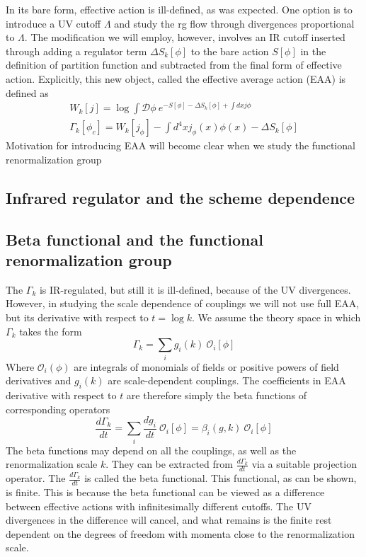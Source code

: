 \documentclass[11pt, a4paper]{article}
\begin{document}
In its bare form, effective action is ill-defined, as was expected. One option is to introduce a UV cutoff $\Lambda$
and study the rg flow through divergences proportional to $\Lambda$. The modification we will employ, however, involves
an IR cutoff inserted through adding a regulator term $\Delta S_k[\phi]$ to the bare action $S[\phi]$ in the definition of partition function
and subtracted from the final form of effective action. Explicitly, this new object, called the effective average action (EAA) is defined as
\begin{gather}
    W_k[j] = \log{\int \mathcal{D}\phi \ e^{-S[\phi] - \Delta S_k[\phi] + \int dx j \phi}}\\
    \Gamma_k[\phi_c] = W_k[j_\phi] - \int d^4 x j_\phi(x) \phi(x) - \Delta S_k[\phi]
\end{gather}
Motivation for introducing EAA will become clear when we study the functional renormalization group

\subsection*{\centering Infrared regulator and the scheme dependence}

\subsection*{\centering Beta functional and the functional renormalization group}

The $\Gamma_k$ is IR-regulated, but still it is ill-defined, because of the UV divergences. 
However, in studying the scale dependence of couplings we will not use full EAA, 
but its derivative with respect to $t = \log{k}$.
We assume the theory space in which $\Gamma_k$ takes the form
\begin{equation}
    \Gamma_k = \sum_i g_i(k) \ \mathcal{O}_i [\phi]
\end{equation}
Where $\mathcal{O}_i (\phi)$ are integrals of monomials of fields or positive powers of field derivatives 
and $g_i(k)$ are scale-dependent couplings.
The coefficients in EAA derivative with respect to $t$ are therefore simply the beta functions of corresponding operators
\begin{equation}
    \frac{d \Gamma_k}{dt} = \sum_i \frac{d g_i}{dt} \ \mathcal{O}_i [\phi] = \beta_i(g,k) \ \mathcal{O}_i [\phi]
\end{equation}
The beta functions may depend on all the couplings, as well as the renormalization scale $k$.
They can be extracted from $\frac{d \Gamma_k}{dt}$ via a suitable projection operator. 
The $\frac{d \Gamma_k}{dt}$ is called the beta functional. This functional, as can be shown, is finite.
This is because the beta functional can be viewed as a difference between effective actions with infinitesimally
different cutoffs. The UV divergences in the difference will cancel, and what remains is the finite rest
dependent on the degrees of freedom with momenta close to the renormalization scale.
\end{document}
